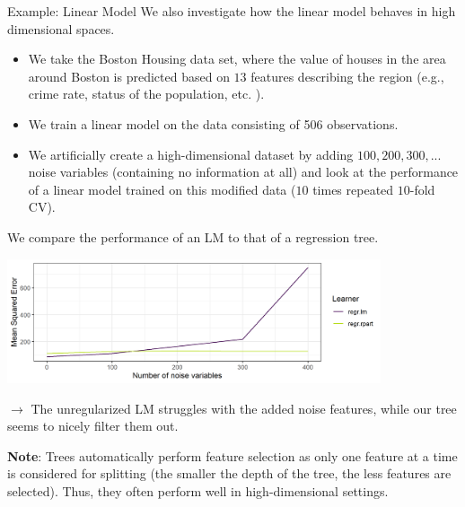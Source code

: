 \documentclass[11pt,compress,t,notes=noshow, xcolor=table]{beamer}
\begin{document}
\begin{vbframe}{Example: Linear Model}
We also investigate how the linear model behaves in high dimensional spaces.

\begin{itemize}
\item We take the Boston Housing data set, where the value of houses in the area around Boston is predicted based on $13$ features describing the region (e.g., crime rate, status of the population, etc. ).
\item We train a linear model on the data consisting of 506 observations. 
\item We artificially create a high-dimensional dataset by adding $100, 200, 300, ...$ noise variables (containing no information at all) and look at the performance of a linear model trained on this modified data ($10$ times repeated $10$-fold CV).
\end{itemize}
\framebreak

We compare the performance of an LM to that of a regression tree.

\vspace*{0.1cm}
\begin{center}
\includegraphics[width = 11cm ]{figure/lm_mse_plot.png}
\end{center}


$\rightarrow$ The unregularized LM struggles with the added noise features, while our tree seems to nicely filter them out.

\vfill

\begin{footnotesize}
\textbf{Note}: Trees automatically perform feature selection as only one feature at a time is considered for splitting (the smaller the depth of the tree, the less features are selected). Thus, they often perform well in high-dimensional settings. 
\end{footnotesize}


\end{vbframe}
\end{document}
